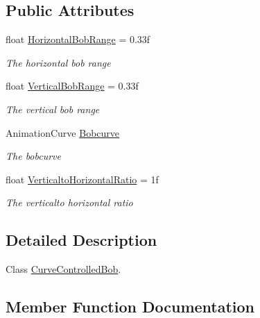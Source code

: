 \subsection*{Public Attributes}
\begin{DoxyCompactItemize}
\item 
float \hyperlink{class_lerp2_assets_1_1_utility_1_1_curve_controlled_bob_a7c6c060e0ed265495be7e3c583535de0}{Horizontal\+Bob\+Range} = 0.\+33f
\begin{DoxyCompactList}\small\item\em The horizontal bob range \end{DoxyCompactList}\item 
float \hyperlink{class_lerp2_assets_1_1_utility_1_1_curve_controlled_bob_ab0a2003411663ba0a80ce442d66d56e6}{Vertical\+Bob\+Range} = 0.\+33f
\begin{DoxyCompactList}\small\item\em The vertical bob range \end{DoxyCompactList}\item 
Animation\+Curve \hyperlink{class_lerp2_assets_1_1_utility_1_1_curve_controlled_bob_ac3e4539c1d58b531b6ade77265c8f466}{Bobcurve}
\begin{DoxyCompactList}\small\item\em The bobcurve \end{DoxyCompactList}\item 
float \hyperlink{class_lerp2_assets_1_1_utility_1_1_curve_controlled_bob_aba22844aa1f4fd153707a727cca9d674}{Verticalto\+Horizontal\+Ratio} = 1f
\begin{DoxyCompactList}\small\item\em The verticalto horizontal ratio \end{DoxyCompactList}\end{DoxyCompactItemize}


\subsection{Detailed Description}
Class \hyperlink{class_lerp2_assets_1_1_utility_1_1_curve_controlled_bob}{Curve\+Controlled\+Bob}. 



\subsection{Member Function Documentation}
\mbox{\label{class_lerp2_assets_1_1_utility_1_1_curve_controlled_bob_a2e72d2f536afd2f2b5bd73c363bb13b1}} 
